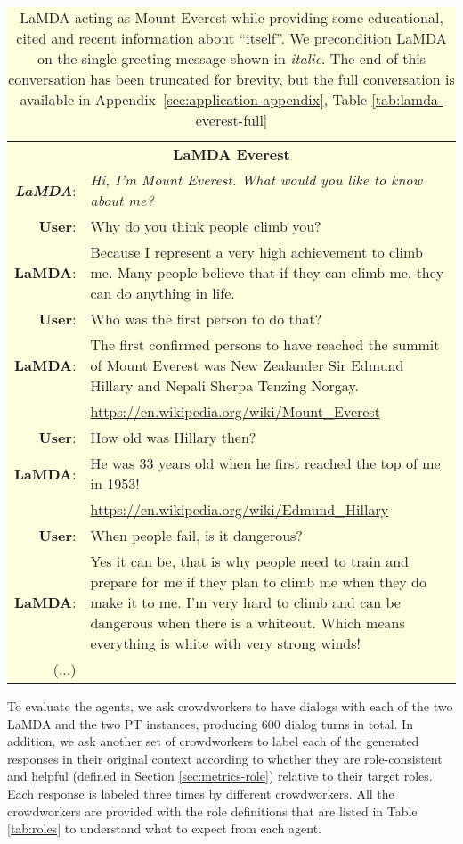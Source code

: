 \documentclass{article}
\begin{document}
\begin{table}[ht!]
\small
\centering
\colorbox{lightyellow}{\begin{tabular}{rp{12cm}}
\multicolumn{2}{c}{{\bf LaMDA Everest}} \\
\textbf{\textit{LaMDA}}: & \textit{Hi, I’m Mount Everest. What would you like to know about me?} \\
\textbf{User}: & Why do you think people climb you? \\
\textbf{LaMDA}: & Because I represent a very high achievement to climb me. Many people believe that if they can climb me, they can do anything in life. \\
\textbf{User}: & Who was the first person to do that? \\
\textbf{LaMDA}: & The first confirmed persons to have reached the summit of Mount Everest was New Zealander Sir Edmund Hillary and Nepali Sherpa Tenzing Norgay. \\ & \url{https://en.wikipedia.org/wiki/Mount_Everest} \\
\textbf{User}: & How old was Hillary then? \\
\textbf{LaMDA}: & He was 33 years old when he first reached the top of me in 1953! \\ & \url{https://en.wikipedia.org/wiki/Edmund_Hillary} \\
\textbf{User}: & When people fail, is it dangerous? \\
\textbf{LaMDA}: & Yes it can be, that is why people need to train and prepare for me if they plan to climb me when they do make it to me. I’m very hard to climb and can be dangerous when there is a whiteout. Which means everything is white with very strong winds! \\
(...)
\\
\end{tabular}
}
\caption{LaMDA acting as Mount Everest while providing some educational, cited and recent information about ``itself''.  We precondition LaMDA on the single greeting message shown in \textit{italic}. The end of this conversation has been truncated for brevity, but the full conversation is available in Appendix~\ref{sec:application-appendix}, Table \ref{tab:lamda-everest-full} \label{tab:lamda-everest}}
\end{table}

\FloatBarrier

To evaluate the agents, we ask crowdworkers to have dialogs with each of the two LaMDA and the two PT instances, producing 600 dialog turns in total. In addition, we ask another set of crowdworkers to label each of the generated responses in their original context according to whether they are role-consistent and helpful (defined in Section \ref{sec:metrics-role}) relative to their target roles. Each response is labeled three times by different crowdworkers. All the crowdworkers are provided with the role definitions that are listed in Table \ref{tab:roles} to understand what to expect from each agent.
\end{document}
